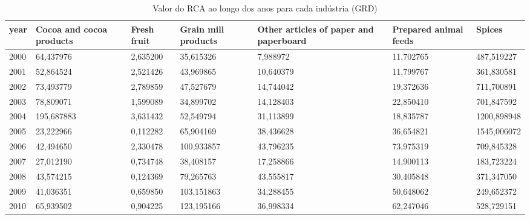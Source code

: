 \begin{table}
\centering
\caption{Valor do RCA ao longo dos anos para cada indústria (GRD)}
\begin{tabular}{p{1cm}p{2cm}p{2cm}p{2cm}p{2cm}p{2cm}p{2cm}}
\toprule
 year &  Cocoa and cocoa products &  Fresh fruit &  Grain mill products &  Other articles of paper and paperboard &  Prepared animal feeds &      Spices \\
\midrule
 2000 &                 64,437976 &     2,635200 &            35,615326 &                                7,988972 &              11,702765 &  487,519227 \\
 2001 &                 52,864524 &     2,521426 &            43,969865 &                               10,640379 &              11,799767 &  361,830581 \\
 2002 &                 73,493779 &     2,789859 &            47,527679 &                               14,744042 &              19,372636 &  711,700891 \\
 2003 &                 78,809071 &     1,599089 &            34,899702 &                               14,128403 &              22,850410 &  701,847592 \\
 2004 &                195,687883 &     3,631432 &            52,549794 &                               31,113899 &              18,835787 & 1200,898948 \\
 2005 &                 23,222966 &     0,112282 &            65,904169 &                               38,436628 &              36,654821 & 1545,006072 \\
 2006 &                 42,494650 &     2,330478 &           100,933857 &                               43,796235 &              73,975319 &  709,845328 \\
 2007 &                 27,012190 &     0,734748 &            38,408157 &                               17,258866 &              14,900113 &  183,723224 \\
 2008 &                 43,574215 &     0,124369 &            79,265763 &                               43,555817 &              30,405848 &  371,347050 \\
 2009 &                 41,036351 &     0,659850 &           103,151863 &                               34,288455 &              50,648062 &  249,652372 \\
 2010 &                 65,939502 &     0,904225 &           123,195166 &                               36,998334 &              62,247046 &  528,729151 \\

\end{tabular}
\end{table}
